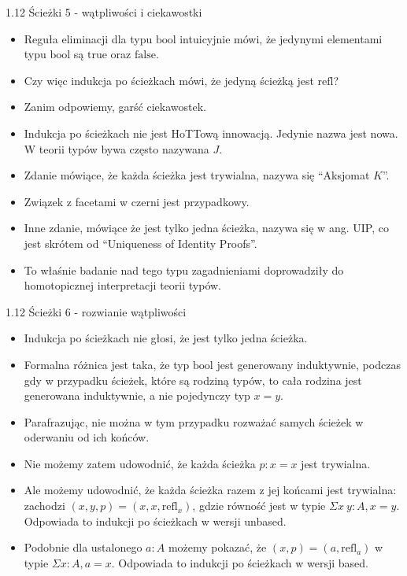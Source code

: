 \documentclass{beamer}
\newcommand{\refl}[1]{\text{refl}_{#1}}
\begin{document}
\begin{frame}{1.12 Ścieżki 5 - wątpliwości i ciekawostki}
\begin{itemize}
	\item Reguła eliminacji dla typu $\text{bool}$ intuicyjnie mówi, że jedynymi elementami typu $\text{bool}$ są $\text{true}$ oraz $\text{false}$.
	\item Czy więc indukcja po ścieżkach mówi, że jedyną ścieżką jest $\text{refl}$?
	\item Zanim odpowiemy, garść ciekawostek.
	\item Indukcja po ścieżkach nie jest HoTTową innowacją. Jedynie nazwa jest nowa. W teorii typów bywa często nazywana $J$.
	\item Zdanie mówiące, że każda ścieżka jest trywialna, nazywa się ``Aksjomat $K$''.
	\item Związek z facetami w czerni jest przypadkowy.
	\item Inne zdanie, mówiące że jest tylko jedna ścieżka, nazywa się w ang. UIP, co jest skrótem od ``Uniqueness of Identity Proofs''.
	\item To właśnie badanie nad tego typu zagadnieniami doprowadziły do homotopicznej interpretacji teorii typów.
\end{itemize}
\end{frame}

\begin{frame}{1.12 Ścieżki 6 - rozwianie wątpliwości}
\begin{itemize}
	\item Indukcja po ścieżkach nie głosi, że jest tylko jedna ścieżka.
	\item Formalna różnica jest taka, że typ $\text{bool}$ jest generowany induktywnie, podczas gdy w przypadku ścieżek, które są rodziną typów, to cała rodzina jest generowana induktywnie, a nie pojedynczy typ $x = y$.
	\item Parafrazując, nie można w tym przypadku rozważać samych ścieżek w oderwaniu od ich końców.
	\item Nie możemy zatem udowodnić, że każda ścieżka $p : x = x$ jest trywialna.
	\item Ale możemy udowodnić, że każda ścieżka razem z jej końcami jest trywialna: zachodzi $(x, y, p) = (x, x, \refl{x})$, gdzie równość jest w typie $\Sigma x\ y : A, x = y$. Odpowiada to indukcji po ścieżkach w wersji unbased.
	\item Podobnie dla ustalonego $a : A$ możemy pokazać, że $(x, p) = (a, \refl{a})$ w typie $\Sigma x : A, a = x$. Odpowiada to indukcji po ścieżkach w wersji based.
\end{itemize}
\end{frame}
\end{document}
